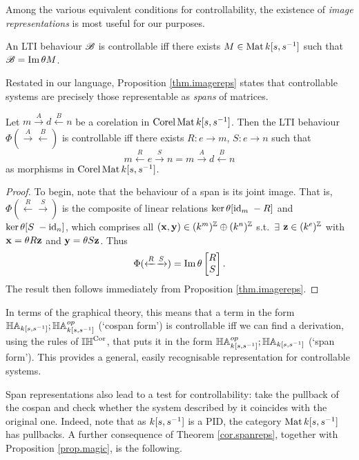 Among the various equivalent conditions for controllability, the existence of
\emph{image representations} is most useful for our purposes.
\begin{proposition} \label{thm.imagereps}
  An LTI behaviour ${\mathscr B}$ is controllable iff there exists $M \in \operatorname{\mathrm{Mat}}{k[s,s^{-1}]}$ such
  that ${\mathscr B} = \mathrm{Im}\, \theta M$.
\end{proposition}

Restated in our language, Proposition \ref{thm.imagereps} states that controllable
systems are precisely those representable as \emph{spans} of matrices. 

\begin{theorem} \label{cor.spanreps}
  Let $m \xrightarrow{A} d \xleftarrow{B} n$ be a corelation in $\operatorname{{Corel}}\operatorname{\mathrm{Mat}}{k[s,s^{-1}]}$.
  Then the LTI behaviour
  $\Phi(\xrightarrow{A}\xleftarrow{B})$ is controllable iff there exists $R: e
  \to m$, $S: e\to n$ such that 
  \[
    m \xleftarrow{R} e \xrightarrow{S} n = m \xrightarrow{A} d \xleftarrow{B} n
  \]
  as morphisms in $\operatorname{{Corel}}\operatorname{\mathrm{Mat}}{k[s,s^{-1}]}$. 
\end{theorem}
\begin{proof}
  To begin, note that the behaviour of a span is its joint image. That is,
  $\Phi(\xleftarrow{R}\xrightarrow{S})$ is the composite of linear
  relations $\ker\theta[\mathrm{id}_m \; -R]$ and $\ker\theta[S\;
  -\mathrm{id}_n]$, which comprises all $(\mathbf{x},\mathbf{y}) \in (k^m)^{\mathbb Z}
  \oplus (k^n)^{\mathbb Z}$ s.t.\ $\exists$ $\mathbf{z} \in (k^e)^{\mathbb Z}$ with
  $\mathbf{x} = \theta R \mathbf{z}$ and $\mathbf{y} = \theta S
  \mathbf{z}$. Thus
  \[
    \Phi(\xleftarrow{R}\xrightarrow{S}) = \mathrm{Im}\, \theta \left[
    \begin{matrix} R \\ S \end{matrix} \right].
  \]
  The result then follows immediately from Proposition \ref{thm.imagereps}.  
\end{proof}

In terms of the graphical theory, this means that a term in the 
form $\mathbb{HA}_{k[s,s^{-1}]} ; \mathbb{HA}_{k[s,s^{-1}]}^{op}$ (`cospan form') is controllable iff we can find a
derivation, using the rules of $\mathbb{IH}^{\mathrm{Cor}}$, that puts it in the form $\mathbb{HA}_{k[s,s^{-1}]}^{op}
; \mathbb{HA}_{k[s,s^{-1}]}$ (`span form').  This provides a general, easily recognisable
representation for controllable systems. 

Span representations also lead to a test for controllability: take
the pullback of the cospan and check whether the system described by it
coincides with the original one. Indeed, note that as ${k[s,s^{-1}]}$ is a PID, the
category $\operatorname{\mathrm{Mat}}{k[s,s^{-1}]}$ has pullbacks. A further consequence of Theorem
\ref{cor.spanreps}, together with Proposition  \ref{prop.magic}, is the following. 

